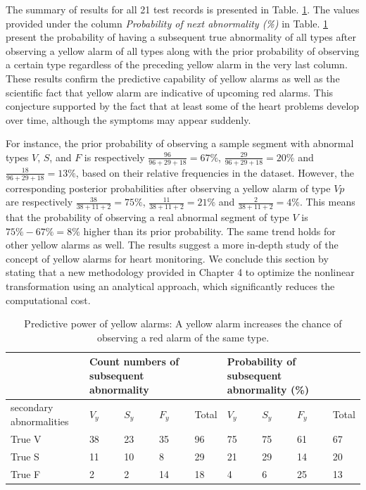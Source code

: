 The summary of results for all 21 test records is presented in Table. \ref{table:pred_kernel}. The values provided under the column \textit{Probability of next abnormality (\%)} in Table. \ref{table:pred_kernel} present the probability of having a subsequent true abnormality of all types after observing a yellow alarm of all types along with the prior probability of observing a certain type regardless of the preceding yellow alarm in the very last column. %
These results confirm the predictive capability of yellow alarms as well as the scientific fact that yellow alarm are indicative of upcoming red alarms. This conjecture supported by the fact that at least some of the heart problems develop over time, although the symptoms may appear suddenly. 
 
For instance, the prior probability of observing a sample segment with abnormal types $V$, $S$, and $F$ is respectively $\frac{96}{96+29+18}=67\%$, $\frac{29}{96+29+18}=20\%$ and $\frac{18}{96+29+18}=13\%$, based on their relative frequencies in the dataset. However, the corresponding posterior probabilities after observing a yellow alarm of type $Vp$ are respectively $\frac{38}{38+11+2}=75\%$, $\frac{11}{38+11+2}=21\%$ and $\frac{2}{38+11+2}=4\%$. This means that the probability of observing a real abnormal segment of type $V$ is $75\%-67\%=8\%$ higher than its prior probability. The same trend holds for other yellow alarms as well. The results suggest a more in-depth study of the concept of yellow alarms for heart monitoring. 
We conclude this section by stating that a new methodology provided in Chapter 4 to optimize the nonlinear transformation using an analytical approach, which significantly reduces the computational cost.

\begin{table}
	\caption{Predictive power of yellow alarms: A yellow alarm increases the chance of observing a red alarm of the same type.}
	\centering
	\begin{tabular}{|m{6em}| m{2em}| m{2em}| m{2em} |m{2em}| m{2em}| m{2em}| m{2em}| m{2em}|}
		\hline
		& \multicolumn{3}{p{6em}}{Count numbers of subsequent abnormality}& &\multicolumn{3}{p{6em}}{Probability of subsequent abnormality (\%)}  & \\ 
		\hline 
		secondary abnormalities & $V_y$ & $S_y$ & $F_y$ & Total & $V_y$ & $S_y$ & $F_y$ & Total \\ 
		\hline 
		True V & 38 & 23 & 35& 96 & 75 & 75 & 61 & 67 \\ 
		\hline 
		True S & 11 & 10 & 8 & 29 & 21 & 29 & 14& 20 \\ 
		\hline 
		True F & 2 & 2 & 14 & 18 & 4 & 6 & 25 & 13 \\ 
		\hline 
	\end{tabular}%
	\label{table:pred_kernel}
\end{table}



